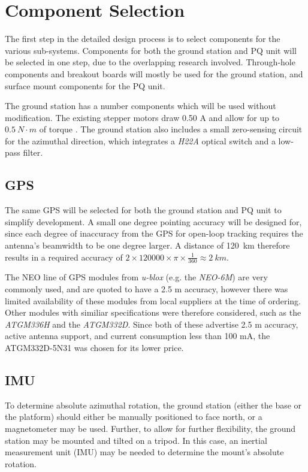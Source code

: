 \graphicspath{{./figures}}

\section{Component Selection}
The first step in the detailed design process is to select components for the various sub-systems. Components for both the ground station and PQ unit will be selected in one step, due to the overlapping research involved. Through-hole components and breakout boards will mostly be used for the ground station, and surface mount components for the PQ unit.

The ground station has a number components which will be used without modification. The existing stepper motors draw 0.50 A and allow for up to $\SI{0.5}{N \cdot m}$ of torque \cite{datasheet-4118}. The ground station also includes a small zero-sensing circuit for the azimuthal direction, which integrates a \textit{H22A} optical switch \cite{datasheet-H22A1} and a low-pass filter.

\subsection{GPS}\label{sec:components_gps}
The same GPS will be selected for both the ground station and PQ unit to simplify development. A small one degree pointing accuracy will be designed for, since each degree of inaccuracy from the GPS for open-loop tracking requires the antenna's beamwidth to be one degree larger. A distance of \SI{120}{km} therefore results in a required accuracy of $2 \times 120 000 \times \pi \times \frac{1}{360} \approx \SI{2}{km}$.

The NEO line of GPS modules from \textit{u-blox} (e.g. the \textit{NEO-6M}) are very commonly used, and are quoted to have a 2.5 m accuracy, however there was limited availability of these modules from local suppliers at the time of ordering. Other modules with similiar specifications were therefore considered, such as the \textit{ATGM336H} and the \textit{ATGM332D}. Since both of these advertise 2.5 m accuracy, active antenna support, and current consumption less than 100 mA, the ATGM332D-5N31 was chosen for its lower price.

\subsection{IMU}
To determine absolute azimuthal rotation, the ground station (either the base or the platform) should either be manually positioned to face north, or a magnetometer may be used. Further, to allow for further flexibility, the ground station may be mounted and tilted on a tripod. In this case, an inertial measurement unit (IMU) may be needed to determine the mount's absolute rotation.


